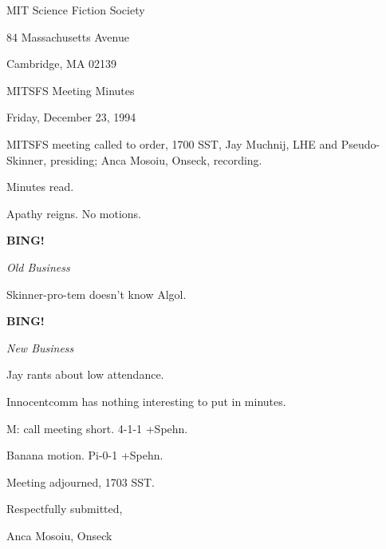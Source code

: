 \documentclass[12pt]{article}
\newcommand{\bing}{{\bf BING!} }
\newcommand{\goto}[1]{\bing \vskip 12pt \centerline{{\em{#1}}}}
\begin{document}
\begin{center}

MIT Science Fiction Society 

84 Massachusetts Avenue

Cambridge, MA 02139

\vspace{12pt}

MITSFS Meeting Minutes 

Friday, December 23, 1994

\end{center}
 
\vspace{18pt}

\setlength{\parskip}{6pt}

\noindent
MITSFS meeting called to order, 1700 SST,
Jay Muchnij, LHE and Pseudo-Skinner, presiding; Anca Mosoiu, Onseck, recording.

Minutes read.

Apathy reigns. No motions.

\goto{Old Business}

Skinner-pro-tem doesn't know Algol.

\goto{New Business}

Jay rants about low attendance.

Innocentcomm has nothing interesting to put in minutes.

M: call meeting short. 4-1-1 +Spehn.

Banana motion. Pi-0-1 +Spehn.

\vspace{12pt}

\noindent
Meeting adjourned, 1703 SST.

\vspace{18pt}

\centerline{Respectfully submitted,}
\centerline{Anca Mosoiu, Onseck}
\end{document}
